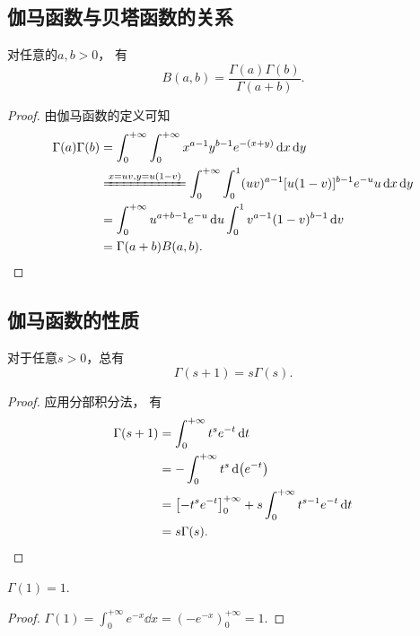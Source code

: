 \subsection{伽马函数与贝塔函数的关系}
\begin{theorem}
对任意的\(a,b>0\)，
有\begin{equation}\label{equation:定积分.伽马函数与贝塔函数的关系}
	B(a,b) = \frac{\Gamma(a) \Gamma(b)}{\Gamma(a+b)}.
\end{equation}
\begin{proof}
由伽马函数的定义可知\begin{align*}
	\Gamma(a) \Gamma(b)
	&= \int_0^{+\infty} \int_0^{+\infty} x^{a-1} y^{b-1} e^{-(x+y)} \dd{x}\dd{y} \\
	&\xlongequal{x=uv,y=u(1-v)}
	\int_0^{+\infty} \int_0^1 (uv)^{a-1} [u(1-v)]^{b-1} e^{-u} u \dd{x}\dd{y} \\
	&=\int_0^{+\infty} u^{a+b-1} e^{-u} \dd{u}
		\int_0^1 v^{a-1} (1-v)^{b-1} \dd{v} \\
	&= \Gamma(a+b) B(a,b).
	\qedhere
\end{align*}
\end{proof}
\end{theorem}

\subsection{伽马函数的性质}
\begin{property}
对于任意\(s > 0\)，总有
\begin{equation}\label{equation:伽马函数.递推公式}
	\Gamma(s+1) = s \Gamma(s).
\end{equation}
\begin{proof}
应用分部积分法，
有\begin{align*}
	\Gamma(s+1)
	&= \int_0^{+\infty} t^s e^{-t} \dd{t} \\
	&= -\int_0^{+\infty} t^s \dd(e^{-t}) \\
	&= \left[-t^s e^{-t}\right]_0^{+\infty}
		+ s \int_0^{+\infty} t^{s-1} e^{-t} \dd{t} \\
	&= s \Gamma(s).
	\qedhere
\end{align*}
\end{proof}
\end{property}

\begin{property}
\(\Gamma(1) = 1\).
\begin{proof}
\(\Gamma(1)
= \int_0^{+\infty} e^{-x} \dd{x}
= \left(-e^{-x}\right)_0^{+\infty}
= 1\).
\end{proof}
\end{property}

